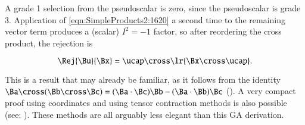 A grade 1 selection from the pseudoscalar is zero, since the pseudoscalar is grade 3.
Application of \cref{eqn:SimpleProducts2:1620} a second time to the remaining vector term produces a (scalar) \( I^2 = -1 \) factor, so after reordering the cross product, the rejection is

\begin{dmath}\label{eqn:projectionAndRejection:1180}
\Rej{\Bu}{\Bx}
=
   \ucap \cross \lr{ \Bx \cross \ucap }.
\end{dmath}

This is a result that may already be familiar,
as it follows from
the identity \( \Ba \cross ( \Bb \cross \Bc ) = (\Ba \cdot \Bc) \Bb - (\Ba \cdot \Bb) \Bc \) (\citep{jackson1975cew}).
A very compact proof using coordinates and using tensor contraction methods is also possible (see: \citep{landau1951classical}).
These methods are all arguably less elegant than this GA derivation.



